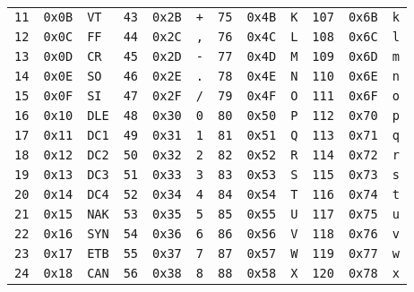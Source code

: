 \begin{table}[h!]
\begin{tabular}{|r r l|r r l|r r l|r r l|}
		\verb!11! & \verb!0x0B! & \verb!VT!  & \verb!43! & \verb!0x2B! & \verb!+! & \verb!75! & \verb!0x4B! & \verb!K! & \verb!107! & \verb!0x6B! & \verb!k!  \\
		\verb!12! & \verb!0x0C! & \verb!FF!  & \verb!44! & \verb!0x2C! & \verb!,! & \verb!76! & \verb!0x4C! & \verb!L! & \verb!108! & \verb!0x6C! & \verb!l!  \\
		\verb!13! & \verb!0x0D! & \verb!CR!  & \verb!45! & \verb!0x2D! & \verb!-! & \verb!77! & \verb!0x4D! & \verb!M! & \verb!109! & \verb!0x6D! & \verb!m!  \\
		\verb!14! & \verb!0x0E! & \verb!SO!  & \verb!46! & \verb!0x2E! & \verb!.! & \verb!78! & \verb!0x4E! & \verb!N! & \verb!110! & \verb!0x6E! & \verb!n!  \\
		\verb!15! & \verb!0x0F! & \verb!SI!  & \verb!47! & \verb!0x2F! & \verb!/! & \verb!79! & \verb!0x4F! & \verb!O! & \verb!111! & \verb!0x6F! & \verb!o!  \\
		\verb!16! & \verb!0x10! & \verb!DLE! & \verb!48! & \verb!0x30! & \verb!0! & \verb!80! & \verb!0x50! & \verb!P! & \verb!112! & \verb!0x70! & \verb!p!  \\
		\verb!17! & \verb!0x11! & \verb!DC1! & \verb!49! & \verb!0x31! & \verb!1! & \verb!81! & \verb!0x51! & \verb!Q! & \verb!113! & \verb!0x71! & \verb!q!  \\
		\verb!18! & \verb!0x12! & \verb!DC2! & \verb!50! & \verb!0x32! & \verb!2! & \verb!82! & \verb!0x52! & \verb!R! & \verb!114! & \verb!0x72! & \verb!r!  \\
		\verb!19! & \verb!0x13! & \verb!DC3! & \verb!51! & \verb!0x33! & \verb!3! & \verb!83! & \verb!0x53! & \verb!S! & \verb!115! & \verb!0x73! & \verb!s!  \\
		\verb!20! & \verb!0x14! & \verb!DC4! & \verb!52! & \verb!0x34! & \verb!4! & \verb!84! & \verb!0x54! & \verb!T! & \verb!116! & \verb!0x74! & \verb!t!  \\
		\verb!21! & \verb!0x15! & \verb!NAK! & \verb!53! & \verb!0x35! & \verb!5! & \verb!85! & \verb!0x55! & \verb!U! & \verb!117! & \verb!0x75! & \verb!u!  \\
		\verb!22! & \verb!0x16! & \verb!SYN! & \verb!54! & \verb!0x36! & \verb!6! & \verb!86! & \verb!0x56! & \verb!V! & \verb!118! & \verb!0x76! & \verb!v!  \\
		\verb!23! & \verb!0x17! & \verb!ETB! & \verb!55! & \verb!0x37! & \verb!7! & \verb!87! & \verb!0x57! & \verb!W! & \verb!119! & \verb!0x77! & \verb!w!  \\
		\verb!24! & \verb!0x18! & \verb!CAN! & \verb!56! & \verb!0x38! & \verb!8! & \verb!88! & \verb!0x58! & \verb!X! & \verb!120! & \verb!0x78! & \verb!x!  \\

\end{tabular}
\end{table}
